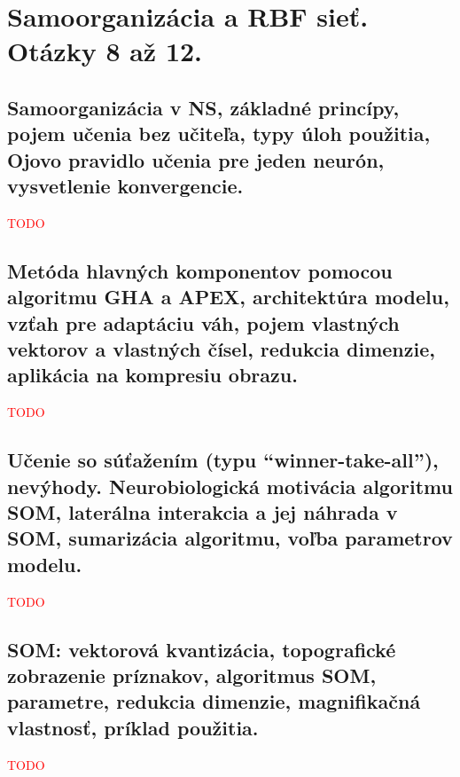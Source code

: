 \documentclass{article}
\numberwithin{equation}{section} %
\begin{document}
\section{Samoorganizácia a RBF sieť. Otázky 8 až 12.}
\subsection{Samoorganizácia v NS, základné princípy, pojem učenia bez učiteľa, typy úloh použitia, Ojovo pravidlo učenia pre jeden neurón, vysvetlenie konvergencie.}
\textcolor{red}{TODO}


\subsection{Metóda hlavných komponentov pomocou algoritmu GHA a APEX, architektúra modelu, vzťah pre adaptáciu váh, pojem vlastných vektorov a vlastných čísel, redukcia dimenzie, aplikácia na kompresiu obrazu.}
\textcolor{red}{TODO}


\subsection{Učenie so súťažením (typu “winner-take-all”), nevýhody. Neurobiologická motivácia algoritmu SOM, laterálna interakcia a jej náhrada v SOM, sumarizácia algoritmu, voľba parametrov modelu.}
\textcolor{red}{TODO}


\subsection{SOM: vektorová kvantizácia, topografické zobrazenie príznakov, algoritmus SOM, parametre, redukcia dimenzie, magnifikačná vlastnosť, príklad použitia.}
\textcolor{red}{TODO}
\end{document}
